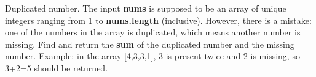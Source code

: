 \documentclass{article}
\begin{document}
    Duplicated number.
    The input \textbf{nums} is supposed to be an array of unique integers ranging from 1 to \textbf{nums.length} (inclusive).
    However, there is a mistake: one of the numbers in the array is duplicated, which means another number is missing.
    Find and return the \textbf{sum} of the duplicated number and the missing number.
    Example: in the array [4,3,3,1], 3 is present twice and 2 is missing, so 3+2=5 should be returned.
\end{document}
